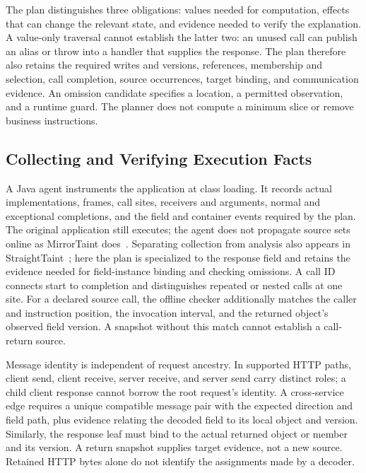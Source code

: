 The plan distinguishes three obligations: values needed for computation,
effects that can change the relevant state, and evidence needed to verify
the explanation. A value-only traversal cannot establish the latter two:
an unused call can publish an alias or throw into a handler that supplies
the response. The plan therefore also retains the required writes and
versions, references, membership and selection, call completion, source
occurrences, target binding, and communication evidence. An omission
candidate specifies a location, a permitted observation, and a runtime
guard. The planner does not compute a minimum slice or remove business
instructions.

\subsection{Collecting and Verifying Execution Facts}
\label{sec:method-evidence}

A Java agent instruments the application at class loading. It records
actual implementations, frames, call sites, receivers and arguments,
normal and exceptional completions, and the field and container events
required by the plan. The original application still executes; the agent
does not propagate source sets online as MirrorTaint does~\cite{ouyang2023mirrortaint}.
Separating collection from analysis also appears in
StraightTaint~\cite{ming2016straighttaint}; here the plan is specialized to
the response field and retains the evidence needed for field-instance
binding and checking omissions. A call ID connects start
to completion and distinguishes repeated or nested calls at one site.
For a declared source call, the offline checker additionally matches the
caller and instruction position, the invocation interval, and the
returned object's observed field version. A snapshot without this match
cannot establish a call-return source.

Message identity is independent of request ancestry. In supported HTTP
paths, client send, client receive, server receive, and server send carry
distinct roles; a child client response cannot borrow the root request's
identity. A cross-service edge requires a unique compatible message pair
with the expected direction and field path, plus evidence relating the
decoded field to its local object and version. Similarly, the response
leaf must bind to the actual returned object or member and its version.
A return snapshot supplies target evidence, not a new source. Retained
HTTP bytes alone do not identify the assignments made by a decoder.

